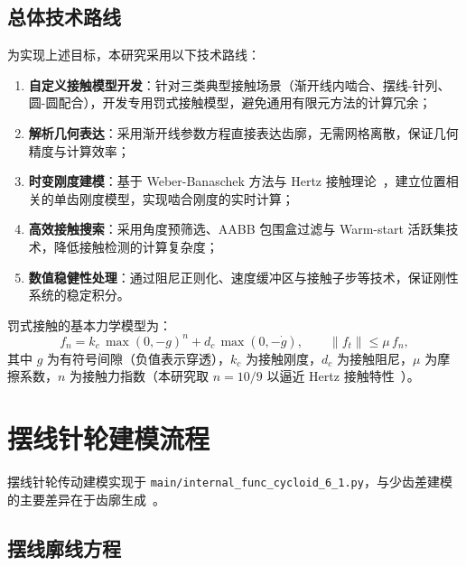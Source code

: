 \documentclass[12pt]{ctexart}
\begin{document}
\subsection{总体技术路线}
为实现上述目标，本研究采用以下技术路线：

\begin{enumerate}
  \item \textbf{自定义接触模型开发}：针对三类典型接触场景（渐开线内啮合、摆线-针列、圆-圆配合），开发专用罚式接触模型，避免通用有限元方法的计算冗余；
  \item \textbf{解析几何表达}：采用渐开线参数方程直接表达齿廓，无需网格离散，保证几何精度与计算效率；
  \item \textbf{时变刚度建模}：基于 Weber-Banaschek 方法与 Hertz 接触理论~\cite{johnson,litvin}，建立位置相关的单齿刚度模型，实现啮合刚度的实时计算；
  \item \textbf{高效接触搜索}：采用角度预筛选、AABB 包围盒过滤与 Warm-start 活跃集技术，降低接触检测的计算复杂度；
  \item \textbf{数值稳健性处理}：通过阻尼正则化、速度缓冲区与接触子步等技术，保证刚性系统的稳定积分。
\end{enumerate}

罚式接触的基本力学模型为：
\begin{equation}
 f_n = k_c \,\max(0,-g)^{n} + d_c \,\max(0,-\dot g), \qquad
 \|f_t\| \le \mu \, f_n ,
 \label{eq:penalty_contact}
\end{equation}
其中 $g$ 为有符号间隙（负值表示穿透），$k_c$ 为接触刚度，$d_c$ 为接触阻尼，$\mu$ 为摩擦系数，$n$ 为接触力指数（本研究取 $n=10/9$ 以逼近 Hertz 接触特性~\cite{johnson}）。



\section{摆线针轮建模流程}

摆线针轮传动建模实现于 \texttt{main/internal\_func\_cycloid\_6\_1.py}，与少齿差建模的主要差异在于齿廓生成~\cite{cycloidmodel}。

\subsection{摆线廓线方程}
\end{document}
